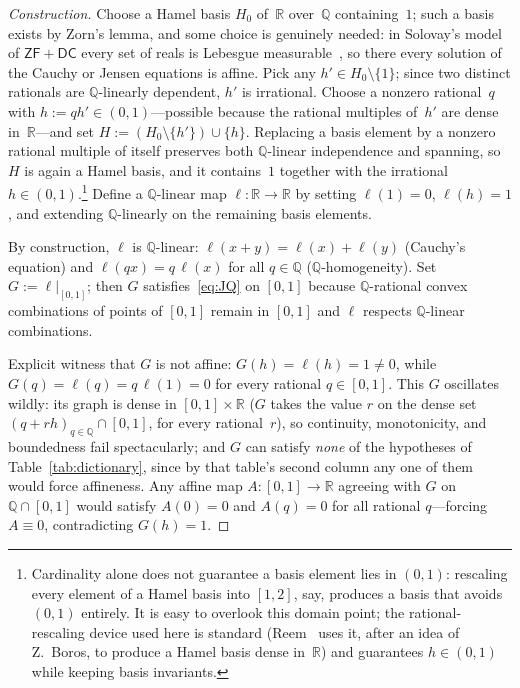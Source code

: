 \documentclass{article}
\theoremstyle{plain}
\theoremstyle{definition}
\newcommand{\R}{\mathbb{R}}
\newcommand{\Q}{\mathbb{Q}}
\begin{document}
\begin{proof}[Construction]
Choose a Hamel basis $H_0$ of~$\R$ over~$\Q$ containing~$1$; such a
basis exists by Zorn's lemma, and some choice is genuinely needed: in
Solovay's model of $\mathsf{ZF}+\mathsf{DC}$ every set of reals is
Lebesgue measurable~\cite{Solovay1970}, so there every solution of the
Cauchy or Jensen equations is affine.
Pick
any $h'\in H_0\setminus\{1\}$; since two distinct rationals are
$\Q$-linearly dependent, $h'$ is irrational. Choose a nonzero rational~$q$
with $h:=qh'\in(0,1)$---possible because the rational multiples of~$h'$
are dense in~$\R$---and set $H:=(H_0\setminus\{h'\})\cup\{h\}$.
Replacing a basis element by a nonzero rational multiple of itself
preserves both $\Q$-linear independence and spanning, so $H$ is again
a Hamel basis, and it contains~$1$ together with the irrational
$h\in(0,1)$.\footnote{Cardinality alone does not guarantee a basis element
lies in $(0,1)$: rescaling every element of a Hamel basis into $[1,2]$, say,
produces a basis that avoids $(0,1)$ entirely. It is easy to overlook
this domain point; the rational-rescaling
device used here is standard (Reem~\cite[Remark~3.4]{Reem2017} uses
it, after an idea of Z.~Boros, to produce a Hamel basis dense
in~$\R$) and guarantees $h \in (0,1)$ while keeping basis invariants.} Define a $\Q$-linear map $\ell\colon\R\to\R$ by setting
$\ell(1)=0$, $\ell(h)=1$, and extending $\Q$-linearly on the remaining
basis elements.

By construction, $\ell$ is $\Q$-linear: $\ell(x+y)=\ell(x)+\ell(y)$
(Cauchy's equation) and $\ell(qx)=q\,\ell(x)$ for all $q\in\Q$
($\Q$-homogeneity). Set $G:=\ell|_{[0,1]}$; then $G$
satisfies~\eqref{eq:JQ} on $[0,1]$ because $\Q$-rational convex
combinations of points of $[0,1]$ remain in $[0,1]$ and $\ell$
respects $\Q$-linear combinations.

Explicit witness that $G$ is not affine: $G(h)=\ell(h)=1\ne0$, while
$G(q)=\ell(q)=q\,\ell(1)=0$ for every rational $q\in[0,1]$. This $G$
oscillates wildly: its graph is dense in $[0,1]\times\R$ ($G$ takes the
value $r$ on the dense set $(q+rh)_{q\in\Q}\cap[0,1]$, for every
rational~$r$), so continuity, monotonicity, and boundedness fail
spectacularly; and $G$ can satisfy \emph{none} of the hypotheses of
Table~\ref{tab:dictionary}, since by that table's second column any one
of them would force affineness. Any affine map $A\colon[0,1]\to\R$ agreeing with $G$ on
$\Q\cap[0,1]$ would satisfy $A(0)=0$ and $A(q)=0$ for all rational
$q$---forcing $A\equiv0$, contradicting $G(h)=1$.
\end{proof}
\end{document}
